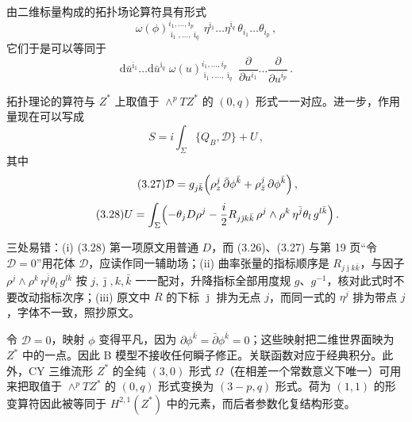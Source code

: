 由二维标量构成的拓扑场论算符具有形式
\begin{equation}\tag{3.24}
\omega(\phi)^{i_1,\ldots,i_p}_{\bar\imath_1,\ldots,\bar\imath_q}\,
\eta^{\bar\imath_1}\ldots\eta^{\bar\imath_q}\,
\theta_{i_1}\ldots\theta_{i_p}\,,
\end{equation}
它们于是可以等同于
\begin{equation}\tag{3.25}
\mathrm{d}\bar u^{\bar\imath_1}\ldots \mathrm{d}\bar u^{\bar\imath_q}\;
\omega(u)^{i_1,\ldots,i_p}_{\bar\imath_1,\ldots,\bar\imath_q}\;
\frac{\partial}{\partial u^{i_1}}\ldots\frac{\partial}{\partial u^{i_p}}\,.
\end{equation}

拓扑理论的算符与 $Z^*$ 上取值于 $\wedge^pTZ^*$ 的 $(0,q)$ 形式一一对应。进一步，作用量现在可以写成
\begin{equation}\tag{3.26}
S=i\int_\Sigma\{Q_B,\mathcal{D}\}+U\,,
\end{equation}
其中
\begin{equation}\tag{3.27}
\mathcal{D}=g_{j\bar k}\Bigl(\rho^j_z\,\bar\partial\phi^{\bar k}+\rho^j_{\bar z}\,\partial\phi^{\bar k}\Bigr)\,,
\end{equation}
\begin{equation}\tag{3.28}
U=\int_\Sigma\Bigl(-\theta_j D\rho^j-\frac{i}{2}R_{j\bar\jmath k\bar k}\,
\rho^j\wedge\rho^k\,\eta^{\bar j}\theta_l\,g^{l\bar k}\Bigr)\,.
\end{equation}
\begin{yizhu}[易错点]
三处易错：(i) (3.28) 第一项原文用普通 $D$，而 (3.26)、(3.27) 与第 19 页“令 $\mathcal{D}=0$”用花体 $\mathcal{D}$，应读作同一辅助场；(ii) 曲率张量的指标顺序是 $R_{j\bar\jmath k\bar k}$，与因子 $\rho^j\wedge\rho^k\,\eta^{\bar j}\theta_l\,g^{l\bar k}$ 按 $j,\bar\jmath,k,\bar k$ 一一配对，升降指标全部用度规 $g$、$g^{-1}$，核对此式时不要改动指标次序；(iii) 原文中 $R$ 的下标 $\bar\jmath$ 排为无点 $j$，而同一式的 $\eta^{\bar j}$ 排为带点 $j$，字体不一致，照抄原文。
\end{yizhu}


令 $\mathcal{D}=0$，映射 $\phi$ 变得平凡，因为 $\partial\phi^{\bar k}=\bar\partial\phi^{\bar k}=0$；这些映射把二维世界面映为 $Z^*$ 中的一点。因此 B 模型不接收任何瞬子修正。关联函数对应于经典积分。此外，CY 三维流形 $Z^*$ 的全纯 $(3,0)$ 形式 $\Omega$（在相差一个常数意义下唯一）可用来把取值于 $\wedge^pTZ^*$ 的 $(0,q)$ 形式变换为 $(3-p,q)$ 形式。荷为 $(1,1)$ 的形变算符因此被等同于 $H^{2,1}(Z^*)$ 中的元素，而后者参数化复结构形变。

